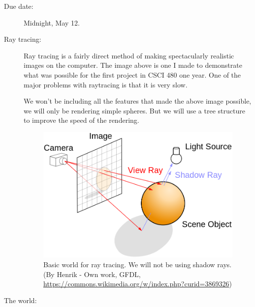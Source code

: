\documentclass{article}
\begin{document}
\begin{description}

\item[Due date:] Midnight, May 12.

\item[Ray tracing:]
Ray tracing is a fairly direct method of making spectacularly
realistic images on the computer.  The image above is one I made to
demonstrate what was possible for the first project in CSCI 480 one
year.  One of the major problems with raytracing is that it is very
slow. 

We won't be including all the features that made the above image
possible, we will only be rendering simple spheres.  But we will use a
tree structure to improve the speed of the rendering.


  \begin{figure}
\centerline{\includegraphics[scale=0.25]{Ray_trace_diagram.png}}
\caption{Basic world for ray tracing.  We will not be using shadow
  rays.
  (By Henrik - Own work, GFDL,
  \url{https://commons.wikimedia.org/w/index.php?curid=3869326})}
    \label{raytracing}
  \end{figure}

\item[The world:]
  

\end{description}
\end{document}
